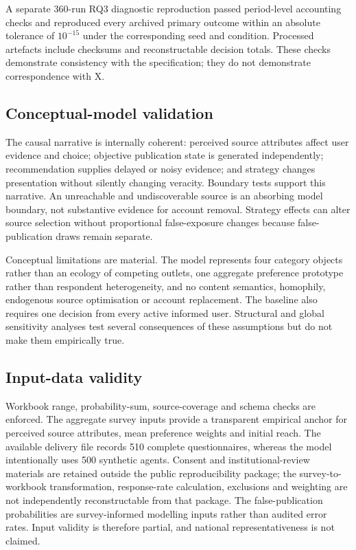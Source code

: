 A separate 360-run RQ3 diagnostic reproduction passed period-level accounting checks and reproduced every archived primary outcome within an absolute tolerance of $10^{-15}$ under the corresponding seed and condition. Processed artefacts include checksums and reconstructable decision totals. These checks demonstrate consistency with the specification; they do not demonstrate correspondence with X.

\subsection{Conceptual-model validation}

The causal narrative is internally coherent: perceived source attributes affect user evidence and choice; objective publication state is generated independently; recommendation supplies delayed or noisy evidence; and strategy changes presentation without silently changing veracity. Boundary tests support this narrative. An unreachable and undiscoverable source is an absorbing model boundary, not substantive evidence for account removal. Strategy effects can alter source selection without proportional false-exposure changes because false-publication draws remain separate.

Conceptual limitations are material. The model represents four category objects rather than an ecology of competing outlets, one aggregate preference prototype rather than respondent heterogeneity, and no content semantics, homophily, endogenous source optimisation or account replacement. The baseline also requires one decision from every active informed user. Structural and global sensitivity analyses test several consequences of these assumptions but do not make them empirically true.

\subsection{Input-data validity}

Workbook range, probability-sum, source-coverage and schema checks are enforced. The aggregate survey inputs provide a transparent empirical anchor for perceived source attributes, mean preference weights and initial reach. The available delivery file records 510 complete questionnaires, whereas the model intentionally uses 500 synthetic agents. Consent and institutional-review materials are retained outside the public reproducibility package; the survey-to-workbook transformation, response-rate calculation, exclusions and weighting are not independently reconstructable from that package. The false-publication probabilities are survey-informed modelling inputs rather than audited error rates. Input validity is therefore partial, and national representativeness is not claimed.

